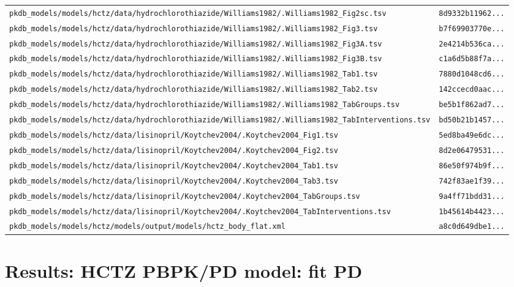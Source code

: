 \documentclass{article}
\begin{document}
\begin{longtable}{ll}
\texttt{pkdb\_models/models/hctz/data/hydrochlorothiazide/Williams1982/.Williams1982\_Fig2sc.tsv} & \texttt{8d9332b11962...} \\
\texttt{pkdb\_models/models/hctz/data/hydrochlorothiazide/Williams1982/.Williams1982\_Fig3.tsv} & \texttt{b7f69903770e...} \\
\texttt{pkdb\_models/models/hctz/data/hydrochlorothiazide/Williams1982/.Williams1982\_Fig3A.tsv} & \texttt{2e4214b536ca...} \\
\texttt{pkdb\_models/models/hctz/data/hydrochlorothiazide/Williams1982/.Williams1982\_Fig3B.tsv} & \texttt{c1a6d5b88f7a...} \\
\texttt{pkdb\_models/models/hctz/data/hydrochlorothiazide/Williams1982/.Williams1982\_Tab1.tsv} & \texttt{7880d1048cd6...} \\
\texttt{pkdb\_models/models/hctz/data/hydrochlorothiazide/Williams1982/.Williams1982\_Tab2.tsv} & \texttt{142ccecd0aac...} \\
\texttt{pkdb\_models/models/hctz/data/hydrochlorothiazide/Williams1982/.Williams1982\_TabGroups.tsv} & \texttt{be5b1f862ad7...} \\
\texttt{pkdb\_models/models/hctz/data/hydrochlorothiazide/Williams1982/.Williams1982\_TabInterventions.tsv} & \texttt{bd50b21b1457...} \\
\texttt{pkdb\_models/models/hctz/data/lisinopril/Koytchev2004/.Koytchev2004\_Fig1.tsv} & \texttt{5ed8ba49e6dc...} \\
\texttt{pkdb\_models/models/hctz/data/lisinopril/Koytchev2004/.Koytchev2004\_Fig2.tsv} & \texttt{8d2e06479531...} \\
\texttt{pkdb\_models/models/hctz/data/lisinopril/Koytchev2004/.Koytchev2004\_Tab1.tsv} & \texttt{86e50f974b9f...} \\
\texttt{pkdb\_models/models/hctz/data/lisinopril/Koytchev2004/.Koytchev2004\_Tab3.tsv} & \texttt{742f83ae1f39...} \\
\texttt{pkdb\_models/models/hctz/data/lisinopril/Koytchev2004/.Koytchev2004\_TabGroups.tsv} & \texttt{9a4ff71bdd31...} \\
\texttt{pkdb\_models/models/hctz/data/lisinopril/Koytchev2004/.Koytchev2004\_TabInterventions.tsv} & \texttt{1b45614b4423...} \\
\texttt{pkdb\_models/models/hctz/models/output/models/hctz\_body\_flat.xml} & \texttt{a8c0d649dbe1...} \\
\end{longtable}

\section{Results: HCTZ PBPK/PD model: fit PD}
\end{document}
